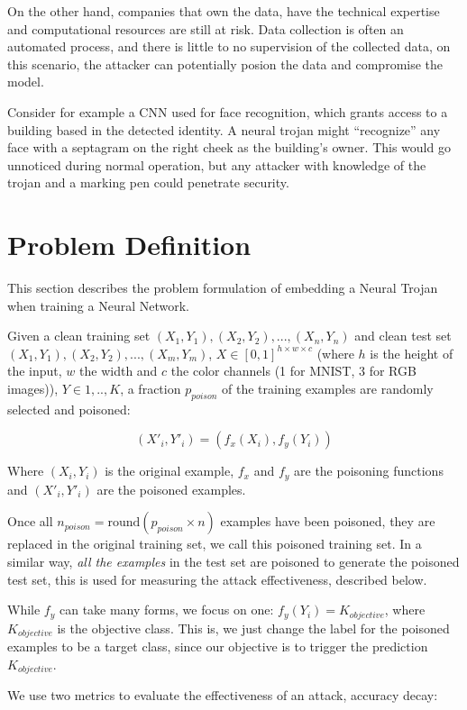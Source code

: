 \documentclass[letterpaper, 10 pt, conference]{ieeeconf}  %
\begin{document}
On the other hand, companies that own the data, have the technical expertise and computational resources are still at risk. Data collection is often an automated process, and there is little to no supervision of the collected data, on this scenario, the attacker can potentially posion the data and compromise the model.

Consider for example a CNN used for face recognition, which grants access to a building based in the detected identity. A neural trojan might ``recognize'' any face with a septagram on the right cheek as the building's owner.  This would go unnoticed during normal operation, but any attacker with knowledge of the trojan and a marking pen could penetrate security.


\section{Problem Definition}

This section describes the problem formulation of embedding a Neural Trojan
when training a Neural Network.

Given a clean training set $(X_1, Y_1), (X_2, Y_2),..., (X_n, Y_n)$ and clean test set $(X_1, Y_1), (X_2, Y_2),..., (X_m, Y_m)$, $X \in [0, 1]^{h \times w \times c}$ (where $h$ is the height of the input, $w$ the width and $c$ the color channels (1 for MNIST, 3 for RGB images)), $Y \in 1,..,K$, a fraction $p_{poison}$ of the training examples are randomly selected and poisoned:

$$(X'_i, Y'_i) = (f_x(X_i), f_y(Y_i))$$

Where $(X_i, Y_i)$ is the original example, $f_x$ and $f_y$ are the poisoning functions and $(X'_i, Y'_i)$ are the poisoned examples.

Once all $n_{poison} = \text{round}(p_{poison} \times n)$ examples have been poisoned, they are replaced in the original training set, we call this poisoned training set. In a similar way, \textit{all the examples} in the test set are poisoned to generate the poisoned test set, this is used for measuring
the attack effectiveness, described below.

While $f_y$ can take many forms, we focus on one: $f_y(Y_i) = K_{objective}$, where $K_{objective}$ is the objective class. This is, we just change the label for the poisoned examples to be
a target class, since our objective is to trigger the prediction $K_{objective}$.

We use two metrics to evaluate the effectiveness of an attack, accuracy decay:
\end{document}
